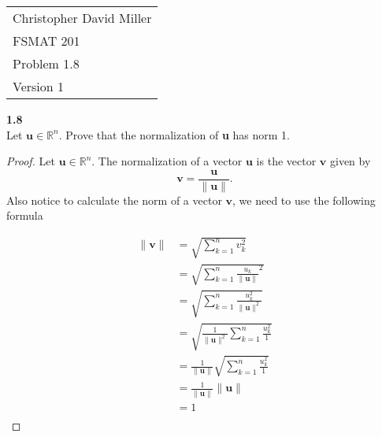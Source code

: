 \documentclass[12pt]{article}
\begin{document}
\begin{flushright}
\begin{tabular}{l}
Christopher David Miller \\  %
FSMAT 201 \\  %
Problem 1.8 \\  %
Version 1 \\ %
\end{tabular}
\end{flushright}
\vspace{20pt}  %


\textbf{1.8} \\  %
Let $\mathbf{u} \in \mathbb{R}^n$. Prove that the normalization of \textbf{u} has norm 1.

\begin{proof}
    Let $\mathbf{u} \in \mathbb{R}^n$.
    The normalization of a vector $\mathbf{u}$ is the vector $\mathbf{v}$ given by   
    \[\mathbf{v} = \frac{\mathbf{u}}{\| \mathbf{u} \|}.\] 
    Also notice to calculate the norm of a vector $\mathbf{v}$, we need to use the following formula
    
        \begin{align*}
          \|  \mathbf{v} \| &= \sqrt{\sum_{k=1}^{n}v_k^2} \\
                            &=  \sqrt{\sum_{k=1}^{n}\frac{u_k}{\| \mathbf{u} \|}^2} \\ 
                            &=  \sqrt{\sum_{k=1}^{n}\frac{u_k^2}{\| \mathbf{u} \|^2}} \\ 
                            &=  \sqrt{\frac{1}{\| \mathbf{u} \|^2}\sum_{k=1}^{n}\frac{u_k^2}{1}} \\
                            &=  \frac{1}{\| \mathbf{u} \|}\sqrt{\sum_{k=1}^{n}\frac{u_k^2}{1}} \\
                            &=  \frac{1}{\| \mathbf{u} \|} \| \mathbf{u} \| \\
                            &=  1 \\
        \end{align*}
        

    
\end{proof}
\end{document}
